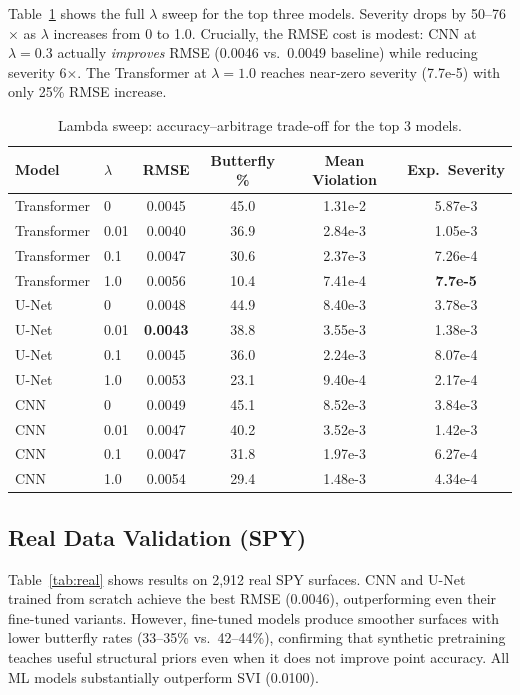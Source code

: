 \documentclass[11pt, a4paper]{article}
\begin{document}
Table~\ref{tab:lambda} shows the full $\lambda$ sweep for the top three models. Severity drops by 50--76$\times$ as $\lambda$ increases from 0 to 1.0. Crucially, the RMSE cost is modest: CNN at $\lambda=0.3$ actually \emph{improves} RMSE (0.0046 vs.\ 0.0049 baseline) while reducing severity 6$\times$. The Transformer at $\lambda=1.0$ reaches near-zero severity (7.7e-5) with only 25\% RMSE increase.

\begin{table}[H]
    \centering
    \caption{Lambda sweep: accuracy--arbitrage trade-off for the top 3 models.}
    \label{tab:lambda}
    \small
    \begin{tabular}{llcccc}
        \toprule
        Model & $\lambda$ & RMSE & Butterfly \% & Mean Violation & Exp.\ Severity \\
        \midrule
        Transformer & 0     & 0.0045 & 45.0 & 1.31e-2 & 5.87e-3 \\
        Transformer & 0.01  & 0.0040 & 36.9 & 2.84e-3 & 1.05e-3 \\
        Transformer & 0.1   & 0.0047 & 30.6 & 2.37e-3 & 7.26e-4 \\
        Transformer & 1.0   & 0.0056 & 10.4 & 7.41e-4 & \textbf{7.7e-5} \\
        \midrule
        U-Net & 0     & 0.0048 & 44.9 & 8.40e-3 & 3.78e-3 \\
        U-Net & 0.01  & \textbf{0.0043} & 38.8 & 3.55e-3 & 1.38e-3 \\
        U-Net & 0.1   & 0.0045 & 36.0 & 2.24e-3 & 8.07e-4 \\
        U-Net & 1.0   & 0.0053 & 23.1 & 9.40e-4 & 2.17e-4 \\
        \midrule
        CNN & 0     & 0.0049 & 45.1 & 8.52e-3 & 3.84e-3 \\
        CNN & 0.01  & 0.0047 & 40.2 & 3.52e-3 & 1.42e-3 \\
        CNN & 0.1   & 0.0047 & 31.8 & 1.97e-3 & 6.27e-4 \\
        CNN & 1.0   & 0.0054 & 29.4 & 1.48e-3 & 4.34e-4 \\
        \bottomrule
    \end{tabular}
\end{table}

\subsection{Real Data Validation (SPY)}

Table~\ref{tab:real} shows results on 2{,}912 real SPY surfaces. CNN and U-Net trained from scratch achieve the best RMSE (0.0046), outperforming even their fine-tuned variants. However, fine-tuned models produce smoother surfaces with lower butterfly rates (33--35\% vs.\ 42--44\%), confirming that synthetic pretraining teaches useful structural priors even when it does not improve point accuracy. All ML models substantially outperform SVI (0.0100).
\end{document}
